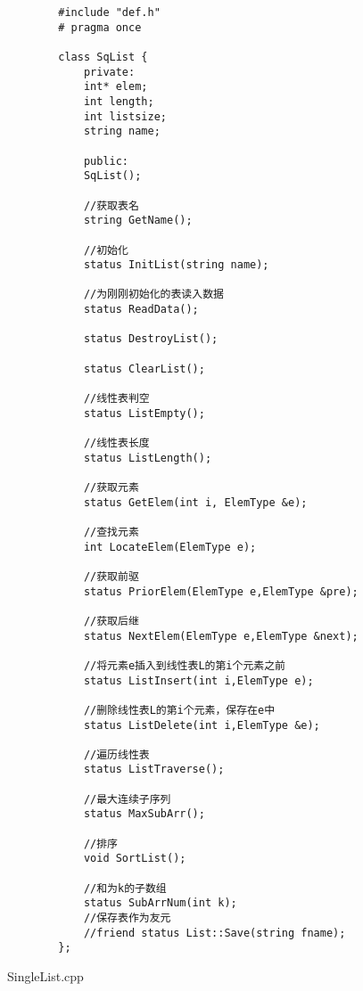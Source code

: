 \documentclass[supercite]{Experimental_Report}
\begin{document}
	\begin{lstlisting}
		#include "def.h"
		# pragma once
		
		class SqList {
			private:
			int* elem;
			int length;
			int listsize;
			string name;
			
			public:
			SqList();
			
			//获取表名
			string GetName();
			
			//初始化
			status InitList(string name);
			
			//为刚刚初始化的表读入数据
			status ReadData();
			
			status DestroyList();
			
			status ClearList();
			
			//线性表判空
			status ListEmpty();
			
			//线性表长度
			status ListLength();
			
			//获取元素
			status GetElem(int i, ElemType &e);
			
			//查找元素
			int LocateElem(ElemType e);
			
			//获取前驱
			status PriorElem(ElemType e,ElemType &pre);
			
			//获取后继
			status NextElem(ElemType e,ElemType &next);
			
			//将元素e插入到线性表L的第i个元素之前
			status ListInsert(int i,ElemType e);
			
			//删除线性表L的第i个元素，保存在e中
			status ListDelete(int i,ElemType &e);
			
			//遍历线性表
			status ListTraverse();
			
			//最大连续子序列
			status MaxSubArr();
			
			//排序
			void SortList();
			
			//和为k的子数组
			status SubArrNum(int k);
			//保存表作为友元
			//friend status List::Save(string fname);
		};
	\end{lstlisting}
	SingleList.cpp
\end{document}
